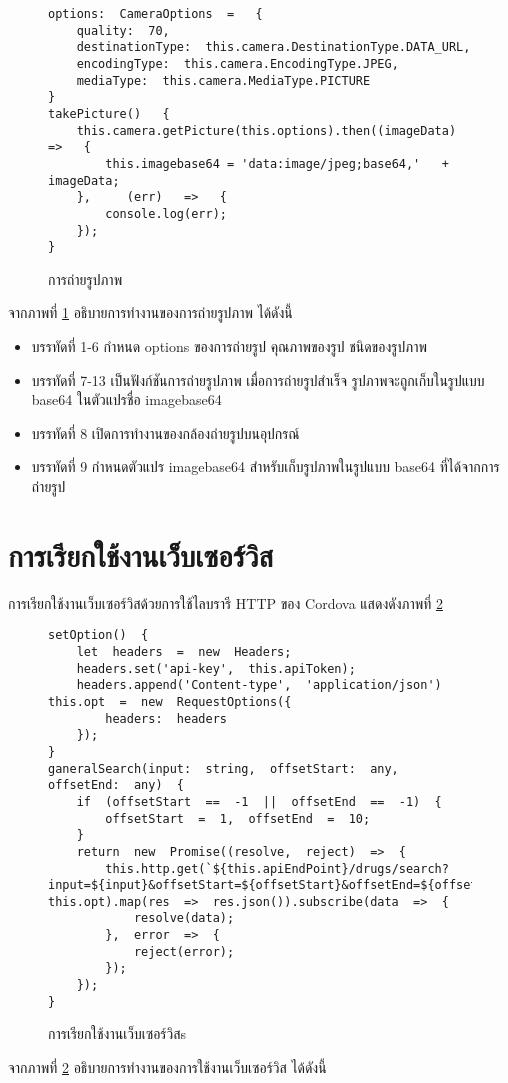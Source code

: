 	\begin{figure}[H]
		{\begin{lstlisting}
options:  CameraOptions  =   {        
    quality:  70,  
	destinationType:  this.camera.DestinationType.DATA_URL,  
    encodingType:  this.camera.EncodingType.JPEG,  
    mediaType:  this.camera.MediaType.PICTURE    
}    
takePicture()   {              
    this.camera.getPicture(this.options).then((imageData)   =>   {                      
        this.imagebase64 = 'data:image/jpeg;base64,'   +   imageData;              
    },     (err)   =>   {                      
        console.log(err);              
    });      
}      
		\end{lstlisting}}
		\caption{การถ่ายรูปภาพ}
		\label{Fig:camera}
	\end{figure}
	จากภาพที่ \ref{Fig:camera} อธิบายการทำงานของการถ่ายรูปภาพ ได้ดังนี้
	\begin{itemize}[label={--}]
		\item บรรทัดที่ 1-6	กำหนด options ของการถ่ายรูป คุณภาพของรูป ชนิดของรูปภาพ 
		\item บรรทัดที่ 7-13	เป็นฟังก์ชันการถ่ายรูปภาพ เมื่อการถ่ายรูปสำเร็จ รูปภาพจะถูกเก็บในรูปแบบ base64 ในตัวแปรชื่อ imagebase64
		\item บรรทัดที่ 8	เปิดการทำงานของกล้องถ่ายรูปบนอุปกรณ์
		\item บรรทัดที่ 9 	กำหนดตัวแปร imagebase64 สำหรับเก็บรูปภาพในรูปแบบ base64 ที่ได้จากการถ่ายรูป
	\end{itemize}

\section{การเรียกใช้งานเว็บเซอร์วิส}
	การเรียกใช้งานเว็บเซอร์วิสด้วยการใช้ไลบรารี HTTP ของ Cordova 
	แสดงดังภาพที่ \ref{Fig:callService}

	\begin{figure}[H]
		{\begin{lstlisting}
setOption()  {        
    let  headers  =  new  Headers;        
    headers.set('api-key',  this.apiToken);        
    headers.append('Content-type',  'application/json')  this.opt  =  new  RequestOptions({            
        headers:  headers        
    });    
}    
ganeralSearch(input:  string,  offsetStart:  any,  offsetEnd:  any)  {        
    if  (offsetStart  ==  -1  ||  offsetEnd  ==  -1)  {            
	    offsetStart  =  1,  offsetEnd  =  10;        
	}        
	return  new  Promise((resolve,  reject)  =>  {            
		this.http.get(`${this.apiEndPoint}/drugs/search?input=${input}&offsetStart=${offsetStart}&offsetEnd=${offsetEnd}`,  this.opt).map(res  =>  res.json()).subscribe(data  =>  {                
			resolve(data);            
		},  error  =>  {                
			reject(error);            
		});        
    });    
}    
		\end{lstlisting}}
		\caption{การเรียกใช้งานเว็บเซอร์วิสs}
		\label{Fig:callService}
	\end{figure}
	จากภาพที่ \ref{Fig:callService} อธิบายการทำงานของการใช้งานเว็บเซอร์วิส ได้ดังนี้
	
